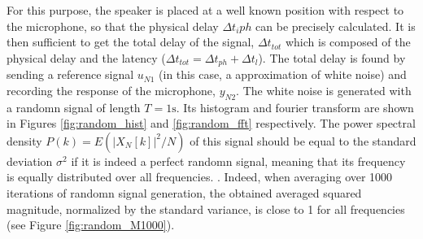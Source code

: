 For this purpose, the speaker is placed at a well known position with respect to the microphone, so that the physical delay $\Delta t_i{ph}$ can be precisely calculated. 
It is then sufficient to get the total delay of the signal, $\Delta t_{tot}$ which is composed of the physical delay and the latency ($\Delta t_{tot}=\Delta t_{ph}+\Delta t_{l}$). 
The total delay is found by sending a reference signal $u_{N1}$ (in this case, a approximation of white noise) and recording the response of the microphone, $y_{N2}$. 
The white noise is generated with a randomn signal of length $T=1\text{s}$. Its histogram and fourier transform are shown in Figures \ref{fig:random_hist} and \ref{fig:random_fft} respectively. 
The power spectral density $P(k)=E(|X_N[k]|^2/N)$ of this signal should be equal to the standard deviation $\sigma^2$ if it is indeed a perfect randomn signal, meaning that its frequency is equally distributed over all frequencies. \cite{Vetterli}.
Indeed, when averaging over 1000 iterations of randomn signal generation, the obtained averaged squared magnitude, normalized by the standard variance, is close to 1 for all frequencies (see Figure \ref{fig:random_M1000}).
